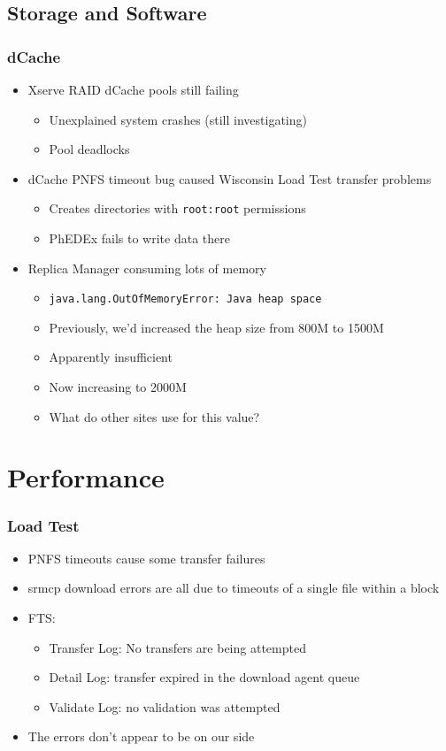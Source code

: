\documentclass{beamer}
\begin{document}
\subsection{Storage and Software}
\begin{frame}
    \frametitle{dCache}
    \begin{itemize}
        \item Xserve RAID dCache pools still failing
        \begin{itemize}
            \item Unexplained system crashes (still investigating)
            \item Pool deadlocks
        \end{itemize}
        \item dCache PNFS timeout bug caused Wisconsin Load Test transfer problems
        \begin{itemize}
            \item Creates directories with {\tt root:root} permissions
            \item PhEDEx fails to write data there
        \end{itemize}
        \item Replica Manager consuming lots of memory
        \begin{itemize}
            \item {\tt java.lang.OutOfMemoryError: Java heap space}
            \item Previously, we'd increased the heap size from 800M to 1500M
            \item Apparently insufficient
            \item Now increasing to 2000M
            \item What do other sites use for this value?
        \end{itemize}
    \end{itemize}
\end{frame}

\section{Performance}
\begin{frame}
    \frametitle{Load Test}
    \begin{itemize}
        \item PNFS timeouts cause some transfer failures
        \item srmcp download errors are all due to timeouts of a single file within a block
        \item FTS:
        \begin{itemize}
            \item Transfer Log: No transfers are being attempted
            \item Detail Log: transfer expired in the download agent queue
            \item Validate Log: no validation was attempted
        \end{itemize}
        \item The errors don't appear to be on our side
    \end{itemize}
\end{frame}
\end{document}
